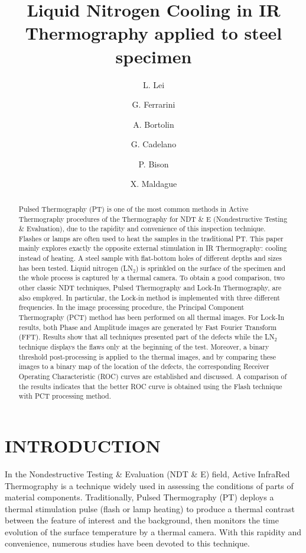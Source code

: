 \documentclass[]{spie}  %
\title{Liquid Nitrogen Cooling in IR Thermography applied to steel specimen}
\author[a]{L. Lei}
\author[b]{G. Ferrarini}
\author[b]{A. Bortolin}
\author[b]{G. Cadelano}
\author[b]{P. Bison}
\author[a]{X. Maldague}
\affil[a]{LVSN, University Laval, 1065 avenue de la Médecine, Québec (Québec) G1V 0A6 Canada}
\affil[b]{CNR-ITC, Corso Stati Uniti 4, 35127 Padova PD, Italy}
\begin{document}
 
\maketitle

\begin{abstract}
Pulsed Thermography (PT) is one of the most common methods in Active Thermography procedures of the Thermography for NDT \& E (Nondestructive Testing \& Evaluation), due to the rapidity and convenience of this inspection technique. Flashes or lamps are often used to heat the samples in the traditional PT. This paper mainly explores exactly the opposite external stimulation in IR Thermography: cooling instead of heating. A steel sample with flat-bottom holes of different depths and sizes has been tested. Liquid nitrogen (LN$_2$) is sprinkled on the surface of the specimen and the whole process is captured by a thermal camera. To obtain a good comparison, two other classic NDT techniques, Pulsed Thermography and Lock-In Thermography, are also employed. In particular, the  Lock-in  method  is  implemented  with  three  different  frequencies.  In  the  image  processing  procedure,  the Principal Component Thermography (PCT) method has been performed on all thermal images. For Lock-In results, both Phase and Amplitude images are generated by Fast Fourier Transform (FFT). Results show that all techniques presented part of the defects while the LN$_2$ technique displays the flaws only at the beginning of the test. Moreover, a binary threshold post-processing is applied to the thermal images, and by comparing these images to a binary map of the location of the defects, the corresponding Receiver Operating Characteristic (ROC) curves are established and discussed. A comparison of the results indicates that the better ROC curve is obtained using the Flash technique with PCT processing method.   
\end{abstract}


\section{INTRODUCTION}
\label{sec:introduction}  %
In the Nondestructive Testing \& Evaluation (NDT \& E) field, Active InfraRed Thermography is a technique widely used in assessing the conditions of parts of material components\cite{Maldague2001theory}. Traditionally, Pulsed Thermography (PT) deploys a thermal stimulation pulse (flash or lamp heating) to produce a thermal contrast between the feature of interest and the background, then monitors the time evolution of the surface temperature by a thermal camera. With this rapidity and convenience, numerous studies have been devoted to this technique\cite{Maldague1993Nondestructive,Maldague1994bInfra,2007-Ibarra-Castanedo,2011-ClementeIbarra-Castanedo,duan2013quantitative}.
\end{document}
